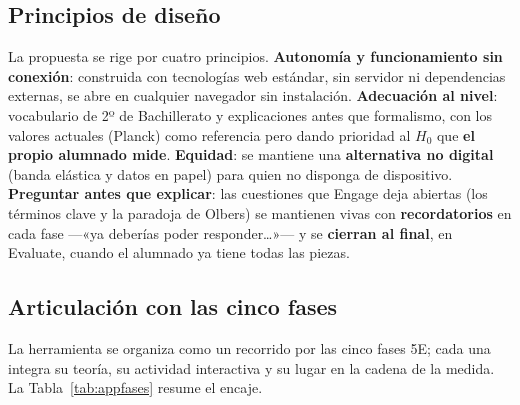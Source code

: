 \subsection{Principios de diseño}

La propuesta se rige por cuatro principios. \textbf{Autonomía y funcionamiento sin conexión}: construida con tecnologías web estándar, sin servidor ni dependencias externas, se abre en cualquier navegador sin instalación. \textbf{Adecuación al nivel}: vocabulario de 2º de Bachillerato y explicaciones antes que formalismo, con los valores actuales (Planck) como referencia pero dando prioridad al $H_{0}$ que \textbf{el propio alumnado mide}. \textbf{Equidad}: se mantiene una \textbf{alternativa no digital} (banda elástica y datos en papel) para quien no disponga de dispositivo. \textbf{Preguntar antes que explicar}: las cuestiones que Engage deja abiertas (los términos clave y la paradoja de Olbers) se mantienen vivas con \textbf{recordatorios} en cada fase ---«ya deberías poder responder\ldots»--- y se \textbf{cierran al final}, en Evaluate, cuando el alumnado ya tiene todas las piezas.

\subsection{Articulación con las cinco fases}

La herramienta se organiza como un recorrido por las cinco fases 5E; cada una integra su teoría, su actividad interactiva y su lugar en la cadena de la medida. La Tabla~\ref{tab:appfases} resume el encaje.

